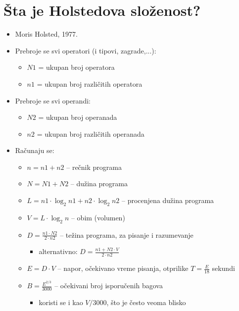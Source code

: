 \documentclass[a4paper]{article}
\begin{document}
\section{Šta je Holstedova složenost?}
\begin{itemize}
  \item Moris Holsted, 1977.
    \item Prebroje se svi operatori (i tipovi, zagrade,...):
      \begin{itemize}
        \item \(N1\) = ukupan broj operatora
        \item \(n1\) = ukupan broj različitih operatora
      \end{itemize}
    \item Prebroje se svi operandi:
      \begin{itemize}
        \item \(N2\) = ukupan broj operanada
        \item \(n2\) = ukupan broj različitih operanada
      \end{itemize}
    \item Računaju se:
      \begin{itemize}
        \item \(n = n1 + n2\) – rečnik programa
        \item \(N = N1 + N2\) – dužina programa
        \item \(L = n1 \cdot \log_2 n1 + n2 \cdot \log_2 n2\) – procenjena dužina programa
        \item \(V = L \cdot \log_2 n\) – obim (volumen)
        \item \(D = \frac{n1 \cdot N2}{2 \cdot n2}\) – težina programa, za pisanje i razumevanje
	\begin{itemize}
        		\item alternativno: \(D = \frac{n1 + N2 \cdot V}{2 \cdot n2}\)
	\end{itemize}
        \item \(E = D \cdot V\) – napor, očekivano vreme pisanja, otprilike \(T = \frac{E}{18}\) sekundi
        \item \(B = \frac{E^{2/3}}{3000}\) – očekivani broj isporučenih bagova
	\begin{itemize}
        		\item koristi se i kao \(V / 3000\), što je često veoma blisko
	\end{itemize}
      \end{itemize}
\end{itemize}
\end{document}

